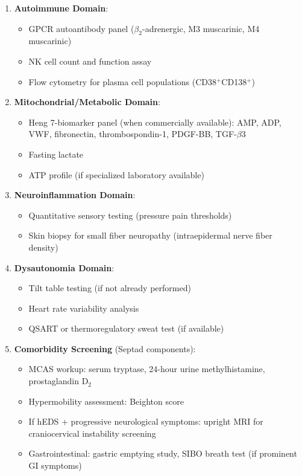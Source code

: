 \begin{enumerate}
    \item \textbf{Autoimmune Domain}:
    \begin{itemize}
        \item GPCR autoantibody panel ($\beta_2$-adrenergic, M3 muscarinic, M4 muscarinic)
        \item NK cell count and function assay
        \item Flow cytometry for plasma cell populations (CD38$^+$CD138$^+$)
    \end{itemize}

    \item \textbf{Mitochondrial/Metabolic Domain}:
    \begin{itemize}
        \item Heng 7-biomarker panel (when commercially available): AMP, ADP, VWF, fibronectin, thrombospondin-1, PDGF-BB, TGF-$\beta$3
        \item Fasting lactate
        \item ATP profile (if specialized laboratory available)
    \end{itemize}

    \item \textbf{Neuroinflammation Domain}:
    \begin{itemize}
        \item Quantitative sensory testing (pressure pain thresholds)
        \item Skin biopsy for small fiber neuropathy (intraepidermal nerve fiber density)
    \end{itemize}

    \item \textbf{Dysautonomia Domain}:
    \begin{itemize}
        \item Tilt table testing (if not already performed)
        \item Heart rate variability analysis
        \item QSART or thermoregulatory sweat test (if available)
    \end{itemize}

    \item \textbf{Comorbidity Screening} (Septad components):
    \begin{itemize}
        \item MCAS workup: serum tryptase, 24-hour urine methylhistamine, prostaglandin D$_2$
        \item Hypermobility assessment: Beighton score
        \item If hEDS + progressive neurological symptoms: upright MRI for craniocervical instability screening
        \item Gastrointestinal: gastric emptying study, SIBO breath test (if prominent GI symptoms)
    \end{itemize}
\end{enumerate}

